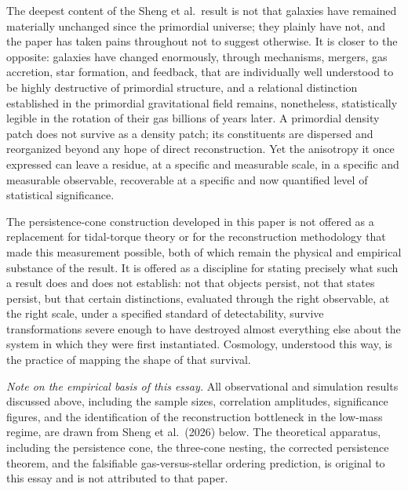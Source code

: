 \documentclass[11pt]{article}
\begin{document}
The deepest content of the Sheng et al.\ result is not that galaxies have remained materially unchanged since the primordial universe; they plainly have not, and the paper has taken pains throughout not to suggest otherwise. It is closer to the opposite: galaxies have changed enormously, through mechanisms, mergers, gas accretion, star formation, and feedback, that are individually well understood to be highly destructive of primordial structure, and a relational distinction established in the primordial gravitational field remains, nonetheless, statistically legible in the rotation of their gas billions of years later. A primordial density patch does not survive as a density patch; its constituents are dispersed and reorganized beyond any hope of direct reconstruction. Yet the anisotropy it once expressed can leave a residue, at a specific and measurable scale, in a specific and measurable observable, recoverable at a specific and now quantified level of statistical significance.

The persistence-cone construction developed in this paper is not offered as a replacement for tidal-torque theory or for the reconstruction methodology that made this measurement possible, both of which remain the physical and empirical substance of the result. It is offered as a discipline for stating precisely what such a result does and does not establish: not that objects persist, not that states persist, but that certain distinctions, evaluated through the right observable, at the right scale, under a specified standard of detectability, survive transformations severe enough to have destroyed almost everything else about the system in which they were first instantiated. Cosmology, understood this way, is the practice of mapping the shape of that survival.

\bigskip
\noindent\textit{Note on the empirical basis of this essay.} All observational and simulation results discussed above, including the sample sizes, correlation amplitudes, significance figures, and the identification of the reconstruction bottleneck in the low-mass regime, are drawn from Sheng et al.\ (2026) below. The theoretical apparatus, including the persistence cone, the three-cone nesting, the corrected persistence theorem, and the falsifiable gas-versus-stellar ordering prediction, is original to this essay and is not attributed to that paper.
\end{document}

